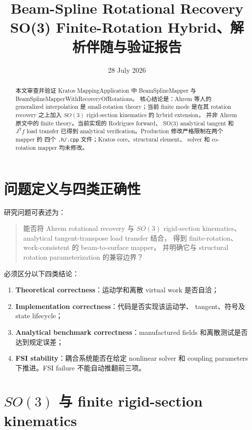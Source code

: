 \documentclass[11pt,a4paper]{article}
\title{Beam-Spline Rotational Recovery\\
\large SO(3) Finite-Rotation Hybrid、解析伴随与验证报告}
\author{}
\date{28 July 2026}
\newcommand{\T}{\mathsf{T}}
\begin{document}
\maketitle

\begin{abstract}
本文审查并验证 Kratos MappingApplication 中
BeamSplineMapper 与
BeamSplineMapperWithRecoveryOfRotations。
核心结论是：Ahrem 等人的 generalized interpolation 是
small-rotation theory；当前 finite mode 是在其 rotation recovery
之上加入 $SO(3)$ rigid-section kinematics 的 hybrid extension，
并非 Ahrem 原文中的 finite theory。当前实现的 Rodrigues forward、
SO(3) analytical tangent 和 $J^\T f$ load transfer 已得到
analytical verification。Production 修改严格限制在两个 mapper 的
四个 \texttt{.h/.cpp} 文件；Kratos core、structural element、
solver 和 co-rotation mapper 均未修改。
\end{abstract}

\section{问题定义与四类正确性}

研究问题可表述为：
\begin{quote}
能否将 Ahrem rotational recovery 与 $SO(3)$ rigid-section
kinematics、analytical tangent-transpose load transfer 结合，
得到 finite-rotation、work-consistent 的 beam-to-surface mapper，
并明确它与 structural rotation parameterization 的兼容边界？
\end{quote}

必须区分以下四类结论：
\begin{enumerate}
  \item \textbf{Theoretical correctness}：运动学和离散 virtual work
        是否自洽；
  \item \textbf{Implementation correctness}：代码是否实现该运动学、
        tangent、符号及 state lifecycle；
  \item \textbf{Analytical benchmark correctness}：manufactured fields
        和离散测试是否达到规定误差；
  \item \textbf{FSI stability}：耦合系统能否在给定 nonlinear solver
        和 coupling parameters 下推进。FSI failure 不能自动推翻前三项。
\end{enumerate}

\section{$SO(3)$ 与 finite rigid-section kinematics}
\end{document}
